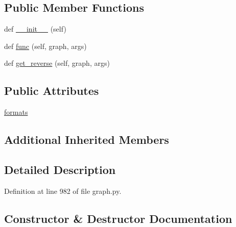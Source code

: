 \subsection*{Public Member Functions}
\begin{DoxyCompactItemize}
\item 
def \hyperlink{classlight__chats_1_1graph_1_1FollowFunction_a9945fa88f60ace0c4ff70bcedde1d92c}{\+\_\+\+\_\+init\+\_\+\+\_\+} (self)
\item 
def \hyperlink{classlight__chats_1_1graph_1_1FollowFunction_a6d1937938725b143930c10260adae130}{func} (self, graph, args)
\item 
def \hyperlink{classlight__chats_1_1graph_1_1FollowFunction_a1421ab114b2675c3a138e6b005036022}{get\+\_\+reverse} (self, graph, args)
\end{DoxyCompactItemize}
\subsection*{Public Attributes}
\begin{DoxyCompactItemize}
\item 
\hyperlink{classlight__chats_1_1graph_1_1FollowFunction_a3d3473d546a129f03d497102b10ea2a9}{formats}
\end{DoxyCompactItemize}
\subsection*{Additional Inherited Members}


\subsection{Detailed Description}
\begin{DoxyVerb}
\end{DoxyVerb}
 

Definition at line 982 of file graph.\+py.



\subsection{Constructor \& Destructor Documentation}
\mbox{\label{classlight__chats_1_1graph_1_1FollowFunction_a9945fa88f60ace0c4ff70bcedde1d92c}} 
